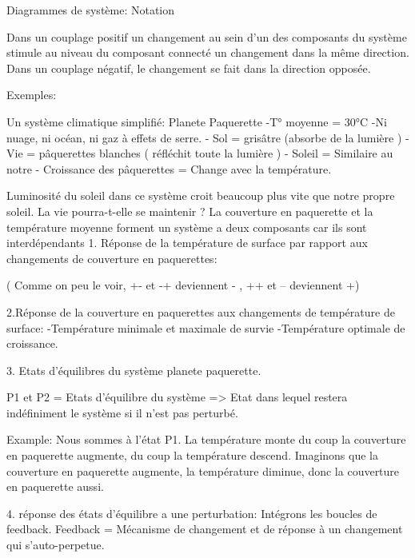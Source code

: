 Diagrammes de système: Notation
  





Dans un couplage positif un changement au sein d’un des composants du système stimule au niveau du composant connecté un changement dans la même direction.
Dans un couplage négatif, le changement se fait dans la direction opposée.


Exemples:
  



Un système climatique simplifié: Planete Paquerette
-T° moyenne = 30°C
-Ni nuage, ni océan, ni gaz à effets de serre.
- Sol = grisâtre (absorbe de la lumière )
- Vie = pâquerettes blanches ( réfléchit toute la lumière )
- Soleil = Similaire au notre
- Croissance des pâquerettes = Change avec la température.




Luminosité du soleil dans ce système croit beaucoup plus vite que notre propre soleil.
La vie pourra-t-elle se maintenir ?
La couverture en paquerette et la température moyenne forment un système a deux composants car ils sont interdépendants
1. Réponse de la température de surface par rapport aux changements de couverture en paquerettes:


  

  

( Comme on peu le voir, +- et -+ deviennent - , ++ et -- deviennent +)
 
2.Réponse de la couverture en paquerettes aux changements de température de surface:
-Température minimale et maximale de survie
-Température optimale de croissance.
  

  

3. Etats d’équilibres du système planete paquerette.
  

P1 et P2 = Etats d’équilibre du système
=> Etat dans lequel restera indéfiniment le système si il n’est pas perturbé.




Example:
Nous sommes à l’état P1.
La température monte du coup  la couverture en paquerette augmente, du coup la température descend.
Imaginons que la couverture en paquerette augmente, la température diminue, donc la couverture en paquerette aussi.






4. réponse des états d’équilibre a une perturbation:  Intégrons les boucles de feedback.
Feedback = Mécanisme de changement et de réponse à un changement qui s’auto-perpetue.


